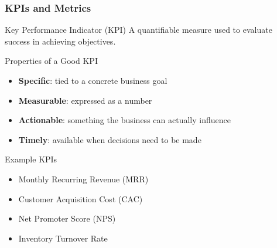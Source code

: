\begin{frame}
  \frametitle{KPIs and Metrics}

  \begin{block}{Key Performance Indicator (KPI)}
    A quantifiable measure used to evaluate success in achieving objectives.
  \end{block}

  \begin{block}{Properties of a Good KPI}
    \begin{itemize}
      \item \textbf{Specific}: tied to a concrete business goal
      \item \textbf{Measurable}: expressed as a number
      \item \textbf{Actionable}: something the business can actually influence
      \item \textbf{Timely}: available when decisions need to be made
    \end{itemize}
  \end{block}

  \begin{examples}{Example KPIs}
    \begin{itemize}
      \item Monthly Recurring Revenue (MRR)
      \item Customer Acquisition Cost (CAC)
      \item Net Promoter Score (NPS)
      \item Inventory Turnover Rate
    \end{itemize}
  \end{examples}

\end{frame}

